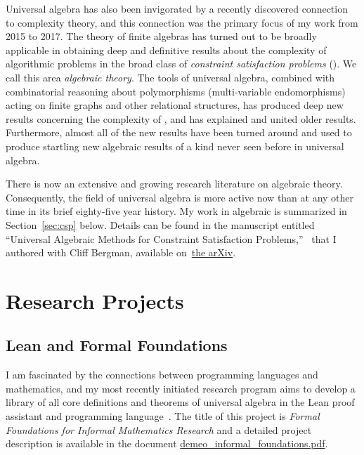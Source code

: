 Universal algebra has also been invigorated by a recently discovered connection to complexity theory, and this connection was the primary focus of my work from 2015 to 2017. 
The theory of finite algebras has turned out to be broadly applicable in obtaining deep and definitive results about the complexity of algorithmic problems in the broad class of  {\it constraint satisfaction problems} (\csps).   We call this area {\it algebraic \csp theory}.
The tools of universal algebra, combined with combinatorial reasoning about polymorphisms (multi-variable endomorphisms) acting on finite graphs and other relational structures, has produced deep new results concerning the complexity of \csps, and has explained and united older results. Furthermore, almost all of the new results have been turned around and used to produce
startling new algebraic results of a kind never seen before in universal algebra.

There is now an extensive and growing research literature on algebraic \csp theory. Consequently, the field of universal algebra is more active now than at any other time in its brief eighty-five year history. My work in algebraic \csp is summarized in Section~\ref{sec:csp} below. Details can be found in the manuscript entitled ``Universal Algebraic Methods for Constraint Satisfaction Problems,''~\cite{Bergman-DeMeo:2016} that I authored with Cliff Bergman, available on~\href{https://arxiv.org/abs/1611.02867}{the arXiv}.

\newpage

\null

\vskip5mm

\section{Research Projects}

\subsection{Lean and Formal Foundations}
\label{sec:formal}
I am fascinated by the connections between programming languages and mathematics, and my most recently initiated research program aims to develop a library of all core definitions and theorems of universal algebra in the Lean proof assistant and programming language~\cite{lean}.
The title of this project is \emph{Formal Foundations for Informal Mathematics Research} and a detailed project description is available in the document 
\href{https://github.com/williamdemeo/job-app/blob/master/research/demeo_informal_foundations.pdf}{demeo\_informal\_foundations.pdf}.

